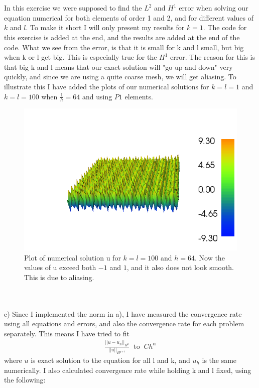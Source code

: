 \documentclass[11pt,a4paper]{report}
\begin{document}
\\
\\
In this exercise we were supposed to find the $L^2$ and $H^1$ error when solving our equation numerical for both elements of order 1 and 2, and for different values of $k$ and $l$. To make it short I will only present my results for $k=1$. The code for this exercise is added at the end, and the results are added at the end of the code. What we see from the error, is that it is small for k and l small, but big when k or l get big. This is especially true for the $H^1$ error. The reason for this is that big k and l means that our exact solution will "go up and down" very quickly, and since we are using a quite coarse mesh, we will get aliasing. To illustrate this I have added the plots of our numerical solutions for $k=l=1$ and $k=l=100$ when $\frac{1}{h}=64$ and using $P1$ elements. 
\begin{figure}
  \includegraphics[width=\linewidth]{dolfin_plot_1.png}
  \caption{Plot of numerical solution u for $k=l=100$ and $h=64$. Now the values of u exceed both $-1$ and $1$, and it also does not look smooth. This is due to aliasing. }
  \label{Fig 2}
\end{figure}
\\
\\
c) Since I implemented the norm in a), I have measured the convergence rate using all equations and errors, and also the convergence rate for each problem separately. This means I have tried to fit 
\begin{align}
\frac{||u-u_h||_{H^p}}{||u||_{H^{q+1}}} \ \text{ to } \ Ch^{\alpha} 
\end{align} 
where $u$ is exact solution to the equation for all l and k, and $u_h$ is the same numerically. I also calculated convergence rate while holding k and l fixed, using the following:
\end{document}
